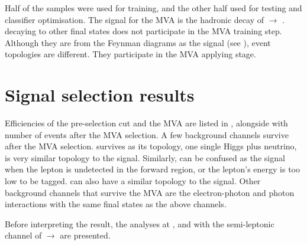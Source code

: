 Half of the samples were used for training, and the other half used for testing and classifier optimisation. The signal for the MVA is the hadronic decay of \eeToHH $\to$ \HepProcess{ \Pbottom \APbottom \PWplus \PWminus \Pnue \APnue}. \eeToHH decaying to other final states does not participate in the MVA training step. Although they are from the Feynman diagrams as the signal (see ), event topologies are different. They participate in the MVA applying stage.

\section{Signal selection results}
\label{sec:doubleHiggsSignalSelResult}

Efficiencies of the pre-selection cut and the MVA are listed in , alongside with number of events after the MVA selection. A few  background channels survive after the MVA selection. \eeTo{\Pquark \APquark \PHiggs \Pnu \APnu} survives as its topology, one single Higgs plus neutrino, is very similar topology to the signal. Similarly, \eeTo{ \Pquark \Pquark \Pquark \Pquark \Plepton \Pnu} can be confused as the signal when the lepton is undetected in the forward region, or the lepton's energy is too low to be tagged. \eeTo{ \Pquark \Pquark \Pquark \Pquark \Pnu \APnu} can also have a similar topology to the signal. Other background channels that survive the MVA are the electron-photon and photon interactions with the same final states as the above channels.



Before interpreting the result, the analyses at , and  with the semi-leptonic channel of \eeToHH $\to$ \HepProcess{ \Pbottom \APbottom \PWplus \PWminus \Pnue \APnue} are presented.

